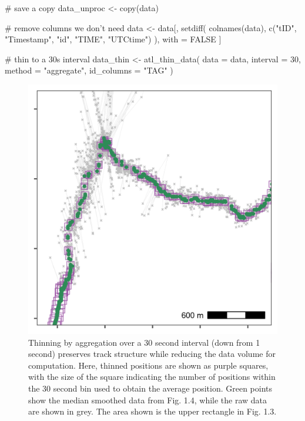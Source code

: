 \documentclass[]{scrreprt}
\newenvironment{Shaded}{}{}
\newcommand{\CommentTok}[1]{\textcolor[rgb]{0.00,0.50,0.00}{#1}}
\newcommand{\DataTypeTok}[1]{#1}
\newcommand{\DecValTok}[1]{#1}
\newcommand{\KeywordTok}[1]{\textcolor[rgb]{0.00,0.00,1.00}{#1}}
\newcommand{\NormalTok}[1]{#1}
\newcommand{\OtherTok}[1]{\textcolor[rgb]{1.00,0.25,0.00}{#1}}
\newcommand{\StringTok}[1]{\textcolor[rgb]{0.00,0.50,0.50}{#1}}
\begin{document}
\begin{Shaded}
\begin{Highlighting}[]
\CommentTok{# save a copy}
\NormalTok{data_unproc <-}\StringTok{ }\KeywordTok{copy}\NormalTok{(data)}

\CommentTok{# remove columns we don't need}
\NormalTok{data <-}\StringTok{ }\NormalTok{data[, }\KeywordTok{setdiff}\NormalTok{(}
  \KeywordTok{colnames}\NormalTok{(data),}
  \KeywordTok{c}\NormalTok{(}\StringTok{"tID"}\NormalTok{, }\StringTok{"Timestamp"}\NormalTok{, }\StringTok{"id"}\NormalTok{, }\StringTok{"TIME"}\NormalTok{, }\StringTok{"UTCtime"}\NormalTok{)}
\NormalTok{),}
\NormalTok{with =}\StringTok{ }\OtherTok{FALSE}
\NormalTok{]}

\CommentTok{# thin to a 30s interval}
\NormalTok{data_thin <-}\StringTok{ }\KeywordTok{atl_thin_data}\NormalTok{(}
  \DataTypeTok{data =}\NormalTok{ data,}
  \DataTypeTok{interval =} \DecValTok{30}\NormalTok{,}
  \DataTypeTok{method =} \StringTok{"aggregate"}\NormalTok{,}
  \DataTypeTok{id_columns =} \StringTok{"TAG"}
\NormalTok{)}
\end{Highlighting}
\end{Shaded}

\begin{figure}
\centering
\includegraphics{figures/fig_calib_smooth_thin.png}
\caption{Thinning by aggregation over a 30 second interval (down from 1 second) preserves track structure while reducing the data volume for computation. Here, thinned positions are shown as purple squares, with the size of the square indicating the number of positions within the 30 second bin used to obtain the average position. Green points show the median smoothed data from Fig. 1.4, while the raw data are shown in grey. The area shown is the upper rectangle in Fig. 1.3.}
\end{figure}
\end{document}
